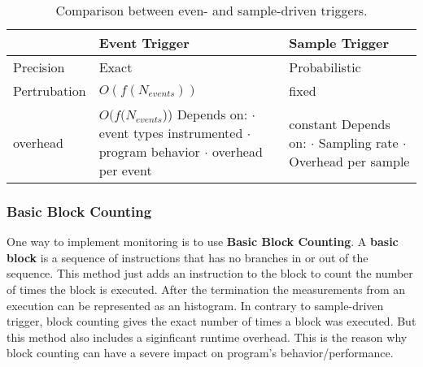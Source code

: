             \begin{table}[h]
                \centering
                \begin{tabular} {| l | l | l |}
                    & Event Trigger & Sample Trigger \\ \hline \hline
                    Precision & Exact & Probabilistic \\ \hline
                    Pertrubation & $O(f(N_{events}))$& fixed \\ \hline
                    overhead &  \makecell[l]{$O(f(N_{events}$)) \\ \\
                                Depends on: \\
                                    $\cdot$ event types instrumented \\
                                    $\cdot$ program behavior \\
                                    $\cdot$ overhead per event \\
                                } & 
                                \makecell[l]{ constant \\ \\
                                Depends on: \\
                                $\cdot$ Sampling rate \\
                                $\cdot$ Overhead per sample \\
                                }
                \end{tabular}
                \caption{Comparison between even- and sample-driven triggers.}
                \label{SerOpt:TriggerComp}
            \end{table}
        \subsubsection{Basic Block Counting}
            \label{SerOpt:BasicBlockCount}
            One way to implement monitoring is to use \textbf{Basic Block 
            Counting}. A \textbf{basic block} is a sequence of instructions that
            has no branches in or out of the sequence. This method just adds an
            instruction to the block to count the number of times the block is
            executed. After the termination the measurements from an execution
            can be represented as an histogram. In contrary to sample-driven
            trigger, block counting gives the exact number of times a block was
            executed. But this method also includes a siginficant runtime 
            overhead. This is the reason why block counting can have a severe
            impact on program's behavior/performance.
        
